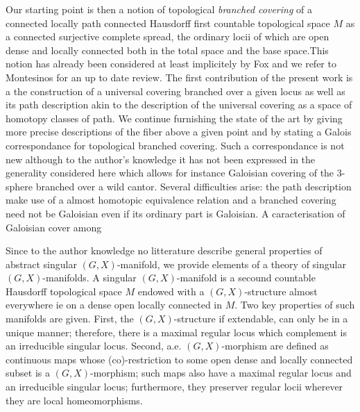 \documentclass[a4paper,12pt]{article}
\begin{document}
Our starting point is then a notion of topological {\it branched covering} of a connected locally path connected Hausdorff first countable topological space $M$ as a connected surjective complete spread, the ordinary locii of which are open dense and locally connected both in the total space and the base space.This notion has already been considered at least implicitely by Fox \cite{MR0123298} and we refer to Montesinos \cite{MR3060537} for an up to date review.
The first contribution of the present work is a the construction of  a universal covering branched over a given locus as well as its path description akin to the description of the universal covering as a space of homotopy classes of path. We continue furnishing the state of the art by giving more precise descriptions of the fiber above a given point and by stating a Galois correspondance for topological branched covering. Such a correspondance is not new although to the author's knowledge it has not been expressed in the generality considered here which allows for instance Galoisian covering of the 3-sphere branched over a wild cantor. Several difficulties arise: the path description make use of a almost homotopic equivalence relation and a branched covering need not be Galoisian even if its ordinary part is Galoisian. A caracterisation of Galoisian cover among  

Since to the author knowledge no litterature describe general properties of abstract singular $(G,X)$-manifold, we provide elements of a theory of singular $(G,X)$-manifolds. A singular $(G,X)$-manifold is a secound countable Hausdorff topological space $M$ endowed with a $(G,X)$-structure almost everywhere ie on a dense open locally connected in $M$. Two key properties of such manifolds are given. First, the $(G,X)$-structure if extendable, can only be in a unique manner; therefore, there is a maximal regular locus which complement is an irreducible singular locus. Second, a.e. $(G,X)$-morphism are defined as continuous maps whose (co)-restriction to some open dense and locally connected subset is a $(G,X)$-morphism; such maps also have a maximal regular locus and an irreducible singular locus; furthermore, they preserver regular locii wherever they are local homeomorphisms.
\end{document}

